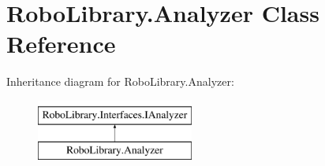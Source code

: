 \hypertarget{class_robo_library_1_1_analyzer}{}\section{Robo\+Library.\+Analyzer Class Reference}
\label{class_robo_library_1_1_analyzer}
Inheritance diagram for Robo\+Library.\+Analyzer\+:\begin{figure}[H]
\begin{center}
\leavevmode
\includegraphics[height=2.000000cm]{class_robo_library_1_1_analyzer}
\end{center}
\end{figure}
